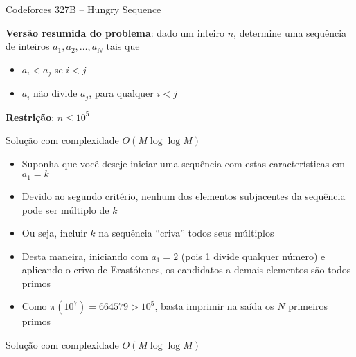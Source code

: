 \begin{frame}[fragile]{Codeforces 327B -- Hungry Sequence}

    \textbf{Versão resumida do problema}: dado um inteiro $n$, determine uma sequência de inteiros
        $a_1, a_2, \ldots, a_N$ tais que

    \begin{itemize}
        \item $a_i < a_j$ se $i < j$
        \item $a_i$ não divide $a_j$, para qualquer $i < j$
    \end{itemize}

    \vspace{0.1in}
    \textbf{Restrição}: $n \leq 10^5$

\end{frame}

\begin{frame}[fragile]{Solução com complexidade $O(M\log \log M)$}

    \begin{itemize}
        \item Suponha que você deseje iniciar uma sequência com estas características em $a_1 = k$

        \item Devido ao segundo critério, nenhum dos elementos subjacentes da sequência pode ser 
            múltiplo de $k$

        \item Ou seja, incluir $k$ na sequência ``criva'' todos seus múltiplos

        \item Desta maneira, iniciando com $a_1 = 2$ (pois 1 divide qualquer número) e aplicando
            o crivo de Erastótenes, os candidatos a demais elementos são todos primos

        \item Como $\pi(10^7) = 664579 > 10^5$, basta imprimir na saída os $N$ primeiros primos
    \end{itemize}

\end{frame}

\begin{frame}[fragile]{Solução com complexidade $O(M\log \log M)$}
\end{frame}
